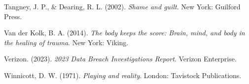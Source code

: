 \documentclass[11pt,a4paper]{article}
\begin{document}
\begin{thebibliography}{99}
Tangney, J. P., \& Dearing, R. L. (2002). \textit{Shame and guilt}. New York: Guilford Press.

Van der Kolk, B. A. (2014). \textit{The body keeps the score: Brain, mind, and body in the healing of trauma}. New York: Viking.

Verizon. (2023). \textit{2023 Data Breach Investigations Report}. Verizon Enterprise.

Winnicott, D. W. (1971). \textit{Playing and reality}. London: Tavistock Publications.

\end{thebibliography}
\end{document}
